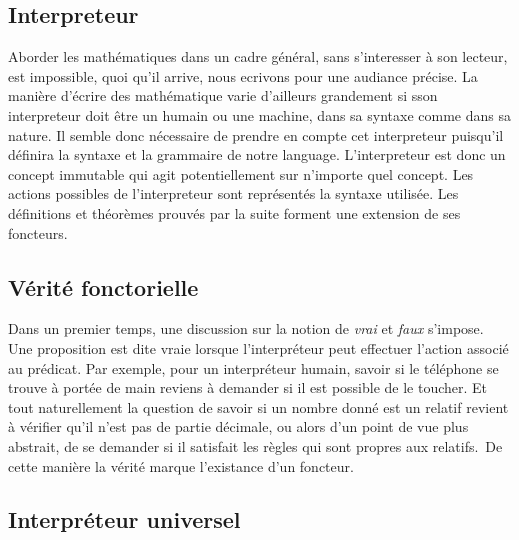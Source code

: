 \documentclass[10pt,b5paper, french]{book}
\begin{document}
\subsection{Interpreteur}
Aborder les mathématiques dans un cadre général, sans s'interesser à son lecteur, est impossible, quoi qu'il arrive, nous ecrivons pour une audiance précise. La manière d'écrire des mathématique varie d'ailleurs grandement si sson interpreteur doit être un humain ou une machine, dans sa syntaxe comme dans sa nature. Il semble donc nécessaire de prendre en compte cet interpreteur puisqu'il définira la syntaxe et la grammaire de notre language.
L'interpreteur est donc un concept immutable qui agit potentiellement sur n'importe quel concept. Les actions possibles de l'interpreteur sont représentés la syntaxe utilisée. Les définitions et théorèmes prouvés par la suite forment une extension de ses foncteurs.	 

\subsection{Vérité fonctorielle}

Dans un premier temps, une discussion sur la notion de \textit{vrai} et \textit{faux} s'impose. Une proposition est dite vraie lorsque l'interpréteur peut effectuer l'action associé au prédicat. Par exemple, pour un interpréteur humain, savoir si le téléphone se trouve à portée de main reviens à demander si il est possible de le toucher. Et tout naturellement la question de savoir si un nombre donné est un relatif revient à vérifier qu'il n'est pas de partie décimale, ou alors d'un point de vue plus abstrait, de se demander si il satisfait les règles qui sont propres aux relatifs.\
De cette manière la vérité marque l'existance d'un foncteur.

\subsection{Interpréteur universel}

 
\printindex
\end{document}
